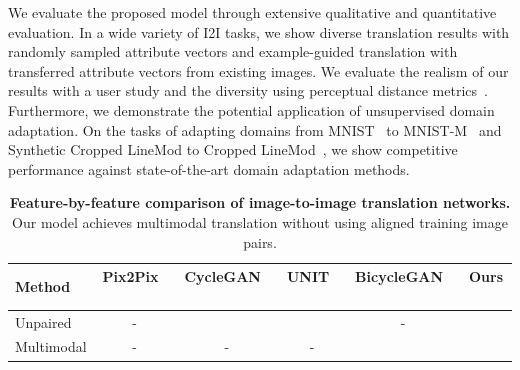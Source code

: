 \documentclass[runningheads]{llncs}
\newcommand{\cmark}{\ding{51}}%
\renewcommand{\jiabin}[1]{}
\begin{document}
We evaluate the proposed model through extensive qualitative and quantitative evaluation.
%
%
In a wide variety of I2I tasks, we show diverse translation results with randomly sampled attribute vectors and example-guided translation with transferred attribute vectors from existing images.
%
%
We evaluate the realism of our results with a user study and the diversity using perceptual distance metrics~\cite{zhang2018perceptual}.
%
Furthermore, we demonstrate the potential application of unsupervised domain adaptation.
%
On the tasks of adapting domains from MNIST~\cite{lecun1998MNIST} to MNIST-M~\cite{ganin2016MNISTM} and Synthetic Cropped LineMod to Cropped LineMod~\cite{hinterstoisser2012linemod,wohlhart2015croplinemod}, we show competitive performance against state-of-the-art domain adaptation methods.
 

\begin{table}[t]
	\caption{\textbf{Feature-by-feature comparison of image-to-image translation networks.} Our model achieves multimodal translation without using aligned training image pairs.}
 	\label{tab:related_work}
	\centering
	\begin{tabular}{l ccccc} 
    	\toprule
Method & 
Pix2Pix~\cite{isola2017pix2pix} \ \ & CycleGAN~\cite{zhu2017cyclegan} \ \ & 
UNIT~\cite{liu2017unit} \ \ &
BicycleGAN~\cite{zhu2017bicyclegan} \ \ & 
Ours \ \  \\
        \midrule
        Unpaired& - & \cmark& \cmark&-& \cmark\\
        Multimodal&-&-&-& \cmark& \cmark\\
		\bottomrule
	\end{tabular}
    \vspace{\tabmargin}
    \vspace{-3mm}
\end{table}
\end{document}
